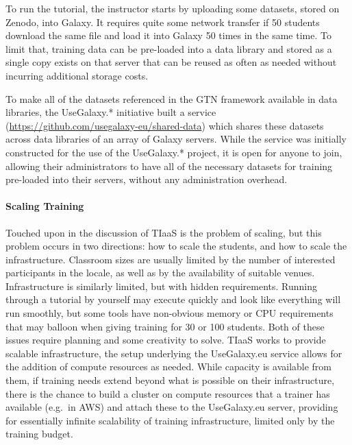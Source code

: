 \documentclass[10pt,letterpaper]{article}
\begin{document}
To run the tutorial, the instructor starts by uploading some datasets, stored on Zenodo, into Galaxy. It requires quite some network transfer if 50 students download the same file and load it into Galaxy 50 times in the same time. To limit that, training data can be pre-loaded into a data library and stored as a single copy exists on that server that can be reused as often as needed without incurring additional storage costs.

To make all of the datasets referenced in the GTN framework available in data libraries, the UseGalaxy.* initiative built a service (\url{https://github.com/usegalaxy-eu/shared-data}) which shares these datasets across data libraries of an array of Galaxy servers. While the service was initially constructed for the use of the UseGalaxy.* project, it is open for anyone to join, allowing their administrators to have all of the necessary datasets for training pre-loaded into their servers, without any administration overhead.

\paragraph*{Scaling Training}
Touched upon in the discussion of TIaaS is the problem of scaling, but this problem occurs in two directions: how to scale the students, and how to scale the infrastructure.
Classroom sizes are usually limited by the number of interested participants in the locale, as well as by the availability of suitable venues.
Infrastructure is similarly limited, but with hidden requirements. Running through a tutorial by yourself may execute quickly and look like everything will run smoothly, but some tools have non-obvious memory or CPU requirements that may balloon when giving training for 30 or 100 students.
Both of these issues require planning and some creativity to solve.
TIaaS works to provide scalable infrastructure, the setup underlying the UseGalaxy.eu service allows for the addition of compute resources as needed.
While capacity is available from them, if training needs extend beyond what is possible on their infrastructure, there is the chance to build a cluster on compute resources that a trainer has available (e.g.\ in AWS) and attach these to the UseGalaxy.eu server, providing for essentially infinite scalability of training infrastructure, limited only by the training budget.
\end{document}
